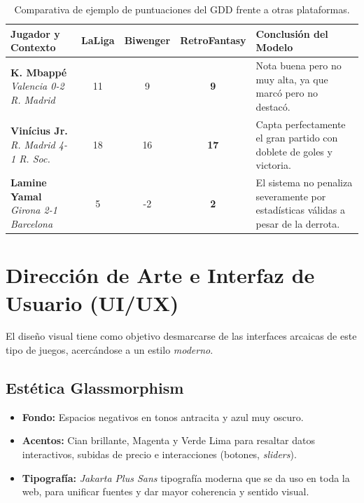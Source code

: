 \begin{table}[H]
    \centering
    \begin{tabular}{|p{3.5cm}|c|c|c|p{4.5cm}|}
        \hline
        \textbf{Jugador y Contexto} & \textbf{LaLiga} & \textbf{Biwenger} & \textbf{RetroFantasy} & \textbf{Conclusión del Modelo} \\
        \hline
        \textbf{K. Mbappé} \newline \textit{Valencia 0-2 R. Madrid} & 11 & 9 & \textbf{9} & Nota buena pero no muy alta, ya que marcó pero no destacó. \\ 
        \hline
        \textbf{Vinícius Jr.} \newline \textit{R. Madrid 4-1 R. Soc.} & 18 & 16 & \textbf{17} & Capta perfectamente el gran partido con doblete de goles y victoria. \\ 
        \hline
        \textbf{Lamine Yamal} \newline \textit{Girona 2-1 Barcelona} & 5 & -2 & \textbf{2} & El sistema no penaliza severamente por estadísticas válidas a pesar de la derrota. \\
        \hline
    \end{tabular}
    \caption{Comparativa de ejemplo de puntuaciones del GDD frente a otras plataformas.}
    \label{tab:comparativa_final_gdd}
\end{table}

\section{Dirección de Arte e Interfaz de Usuario (UI/UX)}

El diseño visual tiene como objetivo desmarcarse de las interfaces arcaicas de este tipo de juegos, acercándose a un estilo \textit{moderno}.

\subsection{Estética Glassmorphism}
\begin{itemize}
    \item \textbf{Fondo:} Espacios negativos en tonos antracita y azul muy oscuro.
    \item \textbf{Acentos:} Cian brillante, Magenta y Verde Lima para resaltar datos interactivos, subidas de precio e interacciones (botones, \textit{sliders}).
    \item \textbf{Tipografía:} \textit{Jakarta Plus Sans} tipografía moderna que se da uso en toda la web, para unificar fuentes y dar mayor coherencia y sentido visual.
\end{itemize}

